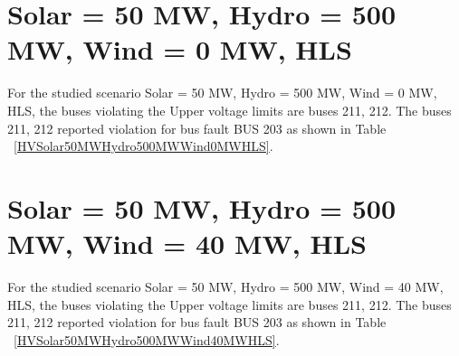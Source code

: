\documentclass[10pt]{report}
\begin{document}
\section{Solar = 50 MW, Hydro = 500 MW, Wind = 0 MW, HLS}
For the studied scenario Solar = 50 MW, Hydro = 500 MW, Wind = 0 MW, HLS, the buses violating the Upper voltage limits are buses 211, 212.
The buses 211, 212 reported violation for bus fault BUS 203 as shown in Table ~\ref{HVSolar50MWHydro500MWWind0MWHLS}.
\begin{table}[H]
\caption{Contingencies reporting bus voltages greater than emergency voltage of 1.1 PU for scenario Solar = 50 MW, Hydro = 500 MW, Wind = 0 MW, HLS}
\label{HVSolar50MWHydro500MWWind0MWHLS}
\centering
{}
\end{table}


\section{Solar = 50 MW, Hydro = 500 MW, Wind = 40 MW, HLS}
For the studied scenario Solar = 50 MW, Hydro = 500 MW, Wind = 40 MW, HLS, the buses violating the Upper voltage limits are buses 211, 212.
The buses 211, 212 reported violation for bus fault BUS 203 as shown in Table ~\ref{HVSolar50MWHydro500MWWind40MWHLS}.
\begin{table}[H]
\caption{Contingencies reporting bus voltages greater than emergency voltage of 1.1 PU for scenario Solar = 50 MW, Hydro = 500 MW, Wind = 40 MW, HLS}
\label{HVSolar50MWHydro500MWWind40MWHLS}
\centering
{}
\end{table}
\end{document}
